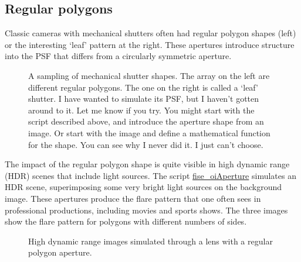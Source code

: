 \documentclass[
  letterpaper,
]{book}
\begin{document}
\subsection{Regular polygons}\label{regular-polygons}

Classic cameras with mechanical shutters often had regular polygon
shapes (left) or the interesting `leaf' pattern at the right. These
apertures introduce structure into the PSF that differs from a
circularly symmetric aperture.

\begin{figure}


\caption{\label{fig-pinhole-polygon}A sampling of mechanical shutter
shapes. The array on the left are different regular polygons. The one on
the right is called a `leaf' shutter. I have wanted to simulate its PSF,
but I haven't gotten around to it. Let me know if you try. You might
start with the script described above, and introduce the aperture shape
from an image. Or start with the image and define a mathematical
function for the shape. You can see why I never did it. I just can't
choose.}

\end{figure}%

The impact of the regular polygon shape is quite visible in high dynamic
range (HDR) scenes that include light sources. The script
\href{../code/02Optics/fise_oiAperturemlx.html}{fise\_oiAperture}
simulates an HDR scene, superimposing some very bright light sources on
the background image. These apertures produce the flare pattern that one
often sees in professional productions, including movies and sports
shows. The three images show the flare pattern for polygons with
different numbers of sides.

\begin{figure}


\caption{\label{fig-pinhole-hdr}High dynamic range images simulated
through a lens with a regular polygon aperture.}

\end{figure}%
\end{document}
